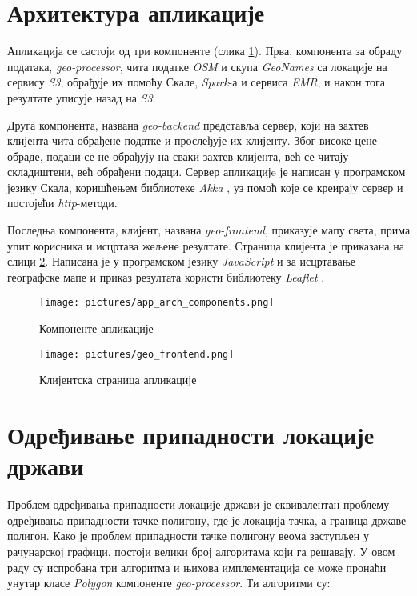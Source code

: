 \documentclass[12pt,oneside]{memoir}
\begin{document}
\section{Архитектура апликације}
\label{sec:app_aphi}

Апликација се састоји од три компоненте (слика \ref{fig:app_components}). Прва, компонента за обраду података, \textit{geo-processor}, чита податке \textit{OSM} и скупа \textit{GeoNames} са локације на сервису \textit{S3}, обрађује их помоћу Скале, \textit{Spark}-а и сервиса \textit{EMR}, и након тога резултате уписује назад на \textit{S3}. 

Друга компонента, названа \textit{geo-backend} представља сервер, који на захтев клијента чита обрађене податке и прослеђује их клијенту. Због високе цене обраде, подаци се не обрађују на сваки захтев клијента, већ се читају складиштени, већ обрађени подаци. Сервер апликацијe је написан у програмском језику Скала, коришћењем библиотеке \textit{Akka} \cite{scala_akka}, уз помоћ које се креирају сервер и постојећи \textit{http}-методи.

Последња компонента, клијент, названа \textit{geo-frontend}, приказује мапу света, прима упит корисника и исцртава жељене резултате. Страница клијента је приказана на слици \ref{fig:app_front}. Написана је у програмском језику \textit{JavaScript} и за исцртавање географске мапе и приказ резултата користи библиотеку \textit{Leaflet} \cite{leaflet}.

\begin{figure}[!ht]
  \centering
  \texttt{[image: pictures/app\_arch\_components.png]}
  \caption{Компоненте апликације}
  \label{fig:app_components}
\end{figure}

\begin{figure}[!ht]
  \centering
  \texttt{[image: pictures/geo\_frontend.png]}
  \caption{Клијентска страница апликације}
  \label{fig:app_front}
\end{figure}

\section{Одређивање припадности локације држави}
\label{sec:poly_cont}

Проблем одређивања припадности локације држави је еквивалентан проблему одређивања припадности тачке полигону, где је локација тачка, а граница државе полигон. Како је проблем припадности тачке полигону веома заступљен у рачунарској графици, постоји велики број алгоритама који га решавају. У овом раду су испробана три алгоритма и њихова имплементација се може пронаћи унутар класе \textit{Polygon} компоненте \textit{geo-processor}. Ти алгоритми су:
\end{document}
